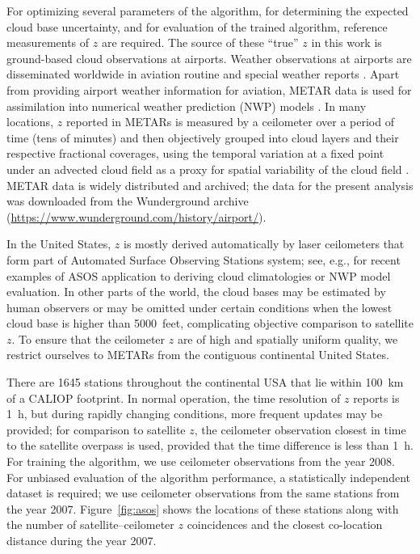 \documentclass[essd,manuscript]{copernicus}\usepackage[]{graphicx}\usepackage[]{color}
\newcommand\CBH{\ensuremath{z}}
\begin{document}



For optimizing several parameters of the algorithm, for determining the expected
cloud base uncertainty, and for evaluation of the trained algorithm, reference
measurements of \CBH{} are required.  The source of these ``true'' \CBH{} in this work
is ground-based cloud observations at airports.  Weather observations at
airports are disseminated worldwide in aviation routine and special weather
reports \citep[METARs and SPECIs, collectively referred to as METARs
henceforth,][]{metar}.  Apart from providing airport weather information for
aviation, METAR data is used for assimilation into numerical weather prediction
(NWP) models \citep[e.g.,][]{Benjamin2016, Dee2011}.  In many locations, \CBH{}
reported in METARs is measured by a ceilometer over a period of time (tens of
minutes) and then objectively grouped into cloud layers and their respective
fractional coverages, using the temporal variation at a fixed point under an
advected cloud field as a proxy for spatial variability of the cloud field
\citep[e.g.,][]{Heese2010}.  METAR data is widely distributed and archived; the
data for the present analysis was downloaded from the Wunderground
archive (\url{https://www.wunderground.com/history/airport/}).

In the United States, \CBH{} is mostly derived automatically by laser ceilometers
that form part of Automated Surface Observing Stations \citep[ASOS,][]{asos}
system; see, e.g., \cite{An2017,Ikeda2017} for recent examples of ASOS
application to deriving cloud climatologies or NWP model evaluation.  In other
parts of the world, the cloud bases may be estimated by human observers or may
be omitted under certain conditions when the lowest cloud base is higher than
5000~\unit{feet}, complicating objective comparison to satellite \CBH{}.  To ensure that
the ceilometer \CBH{} are of high and spatially uniform quality, we restrict
ourselves to METARs from the contiguous continental United States.

There are 1645 %
stations throughout the continental USA that lie within 100~km of a CALIOP
footprint.  In normal operation, the time resolution of \CBH{} reports is 1~h, but
during rapidly changing conditions, more frequent updates may be provided; for
comparison to satellite \CBH{}, the ceilometer observation closest in time to the
satellite overpass is used, provided that the time difference is less than 1~h.
For training the algorithm, we use ceilometer observations from the year 2008.
For unbiased evaluation of the algorithm performance, a statistically
independent dataset is required; we use ceilometer observations from the same
stations from the year 2007.  Figure~\ref{fig:asos} shows the locations of these
stations along with the number of satellite--ceilometer \CBH{} coincidences and the
closest co-location distance during the year 2007.
\end{document}
